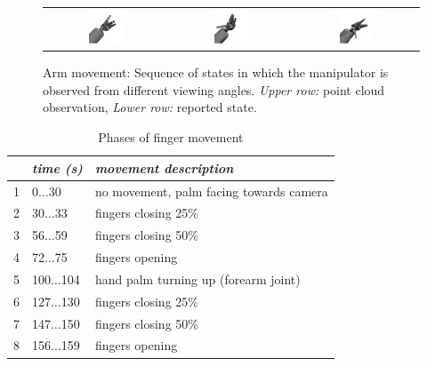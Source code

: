 \begin{figure}
\begin{tabular}{c:c:c}
\includegraphics[width=0.3\textwidth]{images/eval_vicon/sequence/arm_movement/rep_55.png} & \includegraphics[width=0.3\textwidth]{images/eval_vicon/sequence/arm_movement/rep_91.png} & \includegraphics[width=0.3\textwidth]{images/eval_vicon/sequence/arm_movement/rep_132.png} \\
\end{tabular}
\caption{Arm movement: Sequence of states in which the manipulator is observed from different viewing angles. \textit{Upper row:} point cloud observation, \textit{Lower row:} reported state.}
\label{fig:arm_movement_states}
\end{figure}


\begin{table}
\centering
\begin{tabular}{|c|l|l|}
\hline
 & \emph{time (s)} & \emph{movement description} \\
\hline
1 & 0$\dots$30 & no movement, palm facing towards camera \\
\hline
2 & 30$\dots$33 & fingers closing 25\% \\
\hline
3 & 56$\dots$59 & fingers closing 50\% \\
\hline
4 & 72$\dots$75 & fingers opening \\
\hline
5 & 100$\dots$104 & hand palm turning up (forearm joint) \\
\hline
6 & 127$\dots$130 & fingers closing 25\% \\
\hline
7 & 147$\dots$150 & fingers closing 50\% \\
\hline
8 & 156$\dots$159 & fingers opening \\
\hline
\end{tabular}
\caption{Phases of finger movement}
\label{tab:vic_finger_movement_phases}
\end{table}

